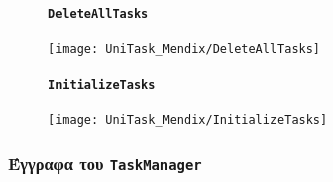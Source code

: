                 \begin{figure}[H] \noindent
                    \paragraph{\texttt{DeleteAllTasks}}
                    \begin{center}
                        \texttt{[image: UniTask\_Mendix/DeleteAllTasks]}
                    \end{center}
                \end{figure}

                \begin{figure}[H] \noindent
                    \paragraph{\texttt{InitializeTasks}}
                    \begin{center}
                        \texttt{[image: UniTask\_Mendix/InitializeTasks]}
                    \end{center}
                \end{figure}



            \subsubsection{Έγγραφα του \texttt{TaskManager}}